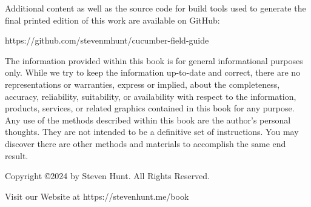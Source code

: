 \thispagestyle{empty}
\begin{center}
Additional content as well as the source code for build tools used to generate the final printed edition of this work are available on GitHub:

https://github.com/stevenmhunt/cucumber-field-guide

The information provided within this book is for general informational purposes only. While we try to keep the information up-to-date and correct, there are no representations or warranties, express or implied, about the completeness, accuracy, reliability, suitability, or availability with respect to the information, products, services, or related graphics contained in this book for any purpose. Any use of the methods described within this book are the author's personal thoughts. They are not intended to be a definitive set of instructions. You may discover there are other methods and materials to accomplish the same end result.

Copyright \copyright  2024 by Steven Hunt. All Rights Reserved.

Visit our Website at https://stevenhunt.me/book

\end{center}
\pagebreak
